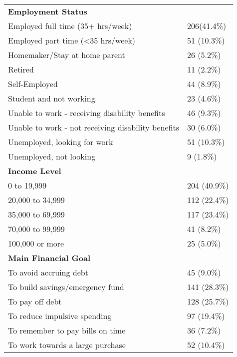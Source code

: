 \begin{longtable}{ll}
\textbf{Employment Status} & \\
\hspace{1em}Employed full time (35+ hrs/week) & 206(41.4\%) \\
\hspace{1em}Employed part time (\textless35 hrs/week) & 51 (10.3\%) \\
\hspace{1em}Homemaker/Stay at home parent & 26 (5.2\%) \\
\hspace{1em}Retired & 11 (2.2\%) \\
\hspace{1em}Self-Employed & 44 (8.9\%) \\
\hspace{1em}Student and not working & 23 (4.6\%) \\
\hspace{1em}Unable to work - receiving disability benefits & 46 (9.3\%) \\
\hspace{1em}Unable to work - not receiving disability benefits & 30 (6.0\%) \\
\hspace{1em}Unemployed, looking for work & 51 (10.3\%) \\
\hspace{1em}Unemployed, not looking & 9 (1.8\%) \\

\textbf{Income Level} & \\
\hspace{1em}0 to 19,999 & 204 (40.9\%) \\
\hspace{1em}20,000 to 34,999 & 112 (22.4\%) \\
\hspace{1em}35,000 to 69,999 & 117 (23.4\%) \\
\hspace{1em}70,000 to 99,999 & 41 (8.2\%) \\
\hspace{1em}100,000 or more & 25 (5.0\%) \\

\textbf{Main Financial Goal} & \\
\hspace{1em}To avoid accruing debt & 45 (9.0\%) \\
\hspace{1em}To build savings/emergency fund & 141 (28.3\%) \\
\hspace{1em}To pay off debt & 128 (25.7\%) \\
\hspace{1em}To reduce impulsive spending & 97 (19.4\%) \\
\hspace{1em}To remember to pay bills on time & 36 (7.2\%) \\
\hspace{1em}To work towards a large purchase & 52 (10.4\%) \\


\end{longtable}
